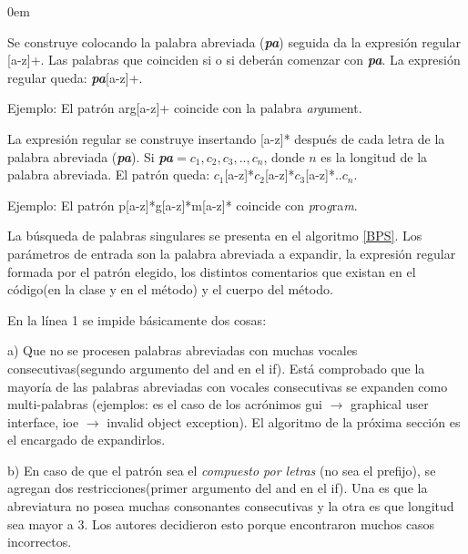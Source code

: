 \documentclass[a4paper,12pt]{report}
\begin{document}
\begin{description}
\itemsep0em%
\item[Patrón prefijo:] Se construye colocando la palabra abreviada (\textit{\textbf{pa}}) seguida da la expresión regular [a-z]+. Las palabras que coinciden si o si deberán comenzar con \textit{\textbf{pa}}. La expresión regular queda: \textit{\textbf{pa}}[a-z]+.

Ejemplo: El patrón \textsf{arg}[a-z]+ coincide con la palabra \textsf{\textit{arg}}ument.

\item[Patrón compuesto por letras:]  La expresión regular se construye insertando [a-z]* después de cada letra de la palabra abreviada (\textit{\textbf{pa}}). Si \textit{\textbf{pa}}$=c_{1},c_{2},c_{3},..,c_{n}$, donde $n$ es la longitud de la palabra abreviada. El patrón queda: $c_{1}$[a-z]*$c_{2}$[a-z]*$c_{3}$[a-z]*..$c_{n}$.

Ejemplo: El patrón \textsf{p}[a-z]*\textsf{g}[a-z]*\textsf{m}[a-z]* coincide con \textsf{\textit{p}}ro\textsf{\textit{g}}ra\textsf{\textit{m}}.
\end{description}



La búsqueda de palabras singulares se presenta en el algoritmo \ref{BPS}. Los parámetros de entrada son la palabra abreviada a expandir, la expresión regular formada por el patrón elegido, los distintos comentarios que existan en el código(en la clase y en el método) y el cuerpo del método.

En la línea 1 se impide básicamente dos cosas: 

a) Que no se procesen palabras abreviadas con muchas vocales consecutivas(segundo argumento del \textsf{and} en el \textsf{if}). Está comprobado que la mayoría de las palabras abreviadas con vocales consecutivas se expanden como multi-palabras (ejemplos: es el caso de los acrónimos \textsf{gui} $\rightarrow$ \textsf{graphical user interface}, \textsf{ioe} $\rightarrow$ \textsf{invalid object exception}). El algoritmo de la próxima sección es el encargado de expandirlos.

b) En caso de que el patrón sea el \textit{compuesto por letras} (no sea el prefijo), se agregan dos restricciones(primer argumento del \textsf{and} en el \textsf{if}). Una es que la abreviatura no posea muchas consonantes consecutivas y la otra es que longitud sea mayor a 3. Los autores decidieron esto porque encontraron muchos casos incorrectos\cite{EZH08}.
\end{document}
